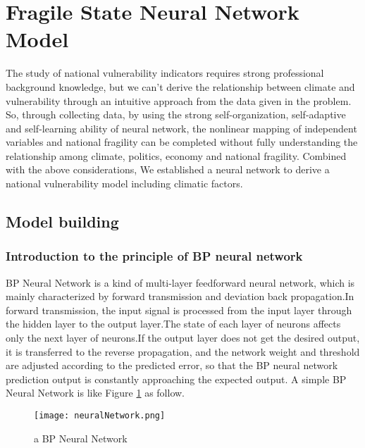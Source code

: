 \documentclass{mcmthesis}
\newcommand{\upcite}[1]{\textsuperscript{\textsuperscript{\cite{#1}}}}
\begin{document}





\section{Fragile State Neural Network Model}
The study of national vulnerability indicators requires strong professional
background knowledge, but we can't derive the relationship between climate
and vulnerability through an intuitive approach from the data given in the 
problem. So, through collecting data, by using the strong self-organization, 
self-adaptive and self-learning ability of neural network, the nonlinear 
mapping of independent variables and national fragility can be completed 
without fully understanding the relationship among climate, politics, 
economy and national fragility. Combined with the above considerations, 
We established a neural network to derive a national vulnerability model 
including climatic factors.
\subsection{Model building}
\subsubsection{Introduction to the principle of BP neural network}
BP Neural Network is a kind of multi-layer feedforward neural network, 
which is mainly characterized by forward transmission and deviation back 
propagation.In forward transmission, the input signal is processed from 
the input layer through the hidden layer to the output layer.The state of 
each layer of neurons affects only the next layer of neurons.If the output 
layer does not get the desired output, it is transferred to the reverse 
propagation, and the network weight and threshold are adjusted according 
to the predicted error, so that the BP neural network prediction output 
is constantly approaching the expected output. A simple BP Neural Network 
is like Figure \ref{fig:nn} as follow.\upcite{bib20}
\begin{figure}[h]
\small
\centering
\texttt{[image: neuralNetwork.png]}
\caption{a BP Neural Network} 
\label{fig:nn}
\end{figure}
\end{document}
